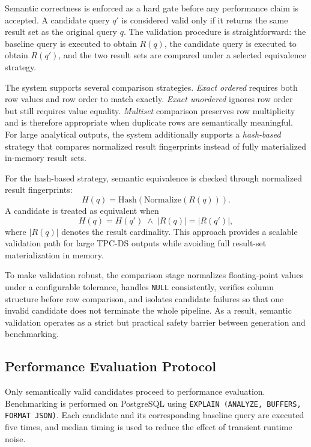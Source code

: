 Semantic correctness is enforced as a hard gate before any performance claim is accepted. A candidate query $q'$ is considered valid only if it returns the same result set as the original query $q$. The validation procedure is straightforward: the baseline query is executed to obtain $R(q)$, the candidate query is executed to obtain $R(q')$, and the two result sets are compared under a selected equivalence strategy.

The system supports several comparison strategies. \textit{Exact ordered} requires both row values and row order to match exactly. \textit{Exact unordered} ignores row order but still requires value equality. \textit{Multiset} comparison preserves row multiplicity and is therefore appropriate when duplicate rows are semantically meaningful. For large analytical outputs, the system additionally supports a \textit{hash-based} strategy that compares normalized result fingerprints instead of fully materialized in-memory result sets.

For the hash-based strategy, semantic equivalence is checked through normalized result fingerprints:
\begin{equation}
H(q) = \mathrm{Hash}(\mathrm{Normalize}(R(q))).
\end{equation}
A candidate is treated as equivalent when
\begin{equation}
H(q) = H(q') \;\land\; |R(q)| = |R(q')|,
\end{equation}
where $|R(q)|$ denotes the result cardinality. This approach provides a scalable validation path for large TPC-DS outputs while avoiding full result-set materialization in memory.

To make validation robust, the comparison stage normalizes floating-point values under a configurable tolerance, handles \texttt{NULL} consistently, verifies column structure before row comparison, and isolates candidate failures so that one invalid candidate does not terminate the whole pipeline. As a result, semantic validation operates as a strict but practical safety barrier between generation and benchmarking.

\subsection{Performance Evaluation Protocol}

Only semantically valid candidates proceed to performance evaluation. Benchmarking is performed on PostgreSQL using \texttt{EXPLAIN (ANALYZE, BUFFERS, FORMAT JSON)}. Each candidate and its corresponding baseline query are executed five times, and median timing is used to reduce the effect of transient runtime noise.

